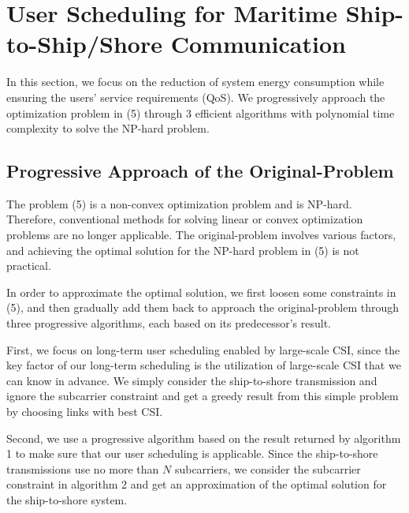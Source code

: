 \documentclass[conference]{IEEEtran}
\begin{document}

\section{User Scheduling for Maritime Ship-to-Ship/Shore Communication}\label{sec:3}

In this section, we focus on the reduction of system energy consumption while ensuring the users' service requirements (QoS). We progressively approach the optimization problem in (5) through 3 efficient algorithms with polynomial time complexity to solve the NP-hard problem.


\subsection{Progressive Approach of the Original-Problem}

The problem (5) is a non-convex optimization problem and is NP-hard. Therefore, conventional methods for solving linear or convex optimization problems are no longer applicable. The original-problem involves various factors, and achieving the optimal solution for the NP-hard problem in (5) is not practical. 

In order to approximate the optimal solution, we first loosen some constraints in (5), and then gradually add them back to approach the original-problem through three progressive algorithms, each based on its predecessor's result. 

First, we focus on long-term user scheduling enabled by large-scale CSI, since the key factor of our long-term scheduling is the utilization of large-scale CSI that we can know in advance. We simply consider the ship-to-shore transmission and ignore the subcarrier constraint and get a greedy result from this simple problem by choosing links with best CSI. 

Second, we use a progressive algorithm based on the result returned by algorithm 1 to make sure that our user scheduling is applicable. Since the ship-to-shore transmissions use no more than $N$ subcarriers, we consider the subcarrier constraint in algorithm 2 and get an approximation of the optimal solution for the ship-to-shore system. 
\end{document}

